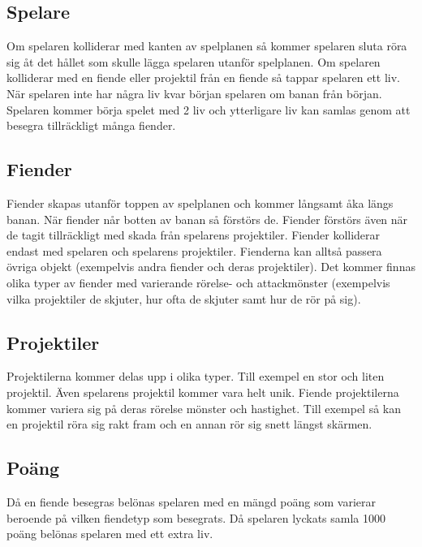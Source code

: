 \documentclass{TDP005mall}
\begin{document}
\subsection{Spelare}
Om spelaren kolliderar med kanten av spelplanen så kommer spelaren sluta röra sig åt det hållet som skulle lägga spelaren utanför spelplanen. 
Om spelaren kolliderar med en fiende eller projektil från en fiende så tappar spelaren ett liv.
När spelaren inte har några liv kvar början spelaren om banan från början.
Spelaren kommer börja spelet med 2 liv och ytterligare liv kan samlas genom att besegra tillräckligt många fiender.

\subsection{Fiender}
Fiender skapas utanför toppen av spelplanen och kommer långsamt åka längs banan. 
När fiender når botten av banan så förstörs de. Fiender förstörs även när de tagit tillräckligt med skada från spelarens projektiler.
Fiender kolliderar endast med spelaren och spelarens projektiler. Fienderna kan alltså passera övriga objekt (exempelvis andra fiender och deras projektiler).
Det kommer finnas olika typer av fiender med varierande rörelse- och attackmönster (exempelvis vilka projektiler de skjuter, hur ofta de skjuter samt hur de rör på sig).

\subsection{Projektiler}
Projektilerna kommer delas upp i olika typer. Till exempel en stor och liten projektil. Även spelarens projektil kommer vara helt unik.
Fiende projektilerna kommer variera sig på deras rörelse mönster och hastighet. 
Till exempel så kan en projektil röra sig rakt fram och en annan rör sig snett längst skärmen.

\subsection{Poäng}
Då en fiende besegras belönas spelaren med en mängd poäng som varierar beroende på vilken fiendetyp som besegrats.
Då spelaren lyckats samla 1000 poäng belönas spelaren med ett extra liv.
\clearpage
\end{document}
